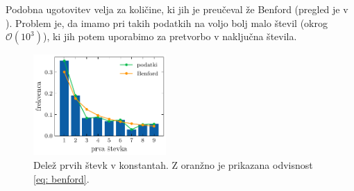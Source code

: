 \documentclass[11pt, oneside]{article}
\theoremstyle{definition}
\begin{document}
Podobna ugotovitev velja za količine, ki jih je preučeval že Benford (pregled je v \cite{scott2001benford}).
Problem je, da imamo pri takih podatkih na voljo bolj malo števil (okrog $\mathcal{O}(10^3)$), ki jih potem
uporabimo za pretvorbo v naključna števila.

\newpage

\vspace*{0.5cm}

\begin{figure}[h!]
    \centering
    \includegraphics[width=0.45\textwidth]{benford_konstante_prva_stevka.pdf}
    \caption{Delež prvih števk v konstantah. Z oranžno je prikazana odvisnost \ref{eq: benford}.}
    \label{fig: ben_konst}
\end{figure}
\end{document}
